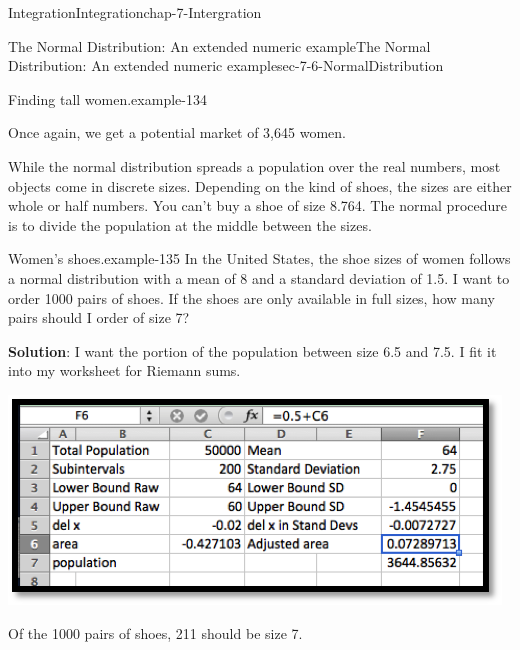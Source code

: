 \documentclass[oneside,10pt,]{book}
\newcommand{\terminology}[1]{\textbf{#1}}
\numberwithin{equation}{section}
\begin{document}
\begin{chapterptx}{Integration}{}{Integration}{}{}{chap-7-Intergration}
\begin{sectionptx}{The Normal Distribution: An extended numeric example}{}{The Normal Distribution: An extended numeric example}{}{}{sec-7-6-NormalDistribution}
\begin{example}{Finding tall women.}{example-134}
\begin{sidebyside}{1}{0.2}{0.2}{0}
\begin{sbspanel}{0.6}
\end{sbspanel}%
\end{sidebyside}%
\par
\hypertarget{p-2959}{}%
Once again, we get a potential market of 3,645 women.%
\end{example}
\hypertarget{p-2960}{}%
While the normal distribution spreads a population over the real numbers, most objects come in discrete sizes.  Depending on the kind of shoes, the sizes are either whole or half numbers.  You can’t buy a shoe of size 8.764.  The normal procedure is to divide the population at the middle between the sizes.%
\begin{example}{Women's shoes.}{example-135}%
\hypertarget{p-2961}{}%
In the United States, the shoe sizes of women follows a normal distribution with a mean of 8 and a standard deviation of 1.5.  I want to order 1000 pairs of shoes.  If the shoes are only available in full sizes, how many pairs should I order of size 7?%
\par
\hypertarget{p-2962}{}%
\terminology{Solution}:  I want the portion of the population between size 6.5 and 7.5.   I fit it into my worksheet for Riemann sums.%
\begin{sidebyside}{1}{0.25}{0.25}{0}%
\begin{sbspanel}{0.5}%
\includegraphics[width=1\linewidth]{images/sec7-6-7.png}
\end{sbspanel}%
\end{sidebyside}%
\par
\hypertarget{p-2963}{}%
Of the 1000 pairs of shoes, 211 should be size 7.%
\end{example}
\hypertarget{p-2964}{}%

\end{sectionptx}
\end{chapterptx}
\end{document}
